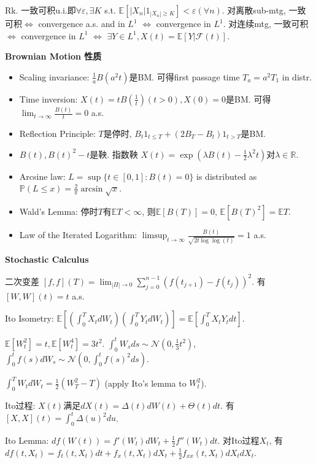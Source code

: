 \documentclass[UTF8]{ctexart}
\begin{document}
Rk. 一致可积u.i.即$\forall \varepsilon, \exists K$ s.t. $\mathbb{E}[|X_n|1_{|X_n|\geq K}]<\varepsilon (\forall n)$.
对离散sub-mtg, 一致可积$\Leftrightarrow$ convergence a.s. and in $L^1$  $\Leftrightarrow$ convergence in $L^1$.
对连续mtg, 一致可积$\Leftrightarrow$ convergence in $L^1$  $\Leftrightarrow$ $\exists Y\in L^1, X(t)=\mathbb{E}[Y|\mathcal{F}(t)]$.


\noindent \textbf{Brownian Motion 性质}
\begin{itemize}
\item Scaling invariance: $\frac{1}{a} B(a^2t)$是BM. 可得first passage time $T_a=a^2 T_1$ in distr.
\item Time inversion: $X(t)=tB(\frac{1}{t})(t>0),X(0)=0$是BM. 可得 $\lim_{t\to\infty}\frac{B(t)}{t}=0$ a.s. 
\item Reflection Principle: $T$是停时, $B_t1_{t\leq T}+(2B_T-B_t)1_{t>T}$是BM.
\item $B(t), B(t)^2-t$是鞅. 指数鞅 $X(t)=\exp(\lambda B(t)-\frac12 \lambda^2 t)$对$\lambda\in\mathbb{R}$.
\item Arcsine law: $L=\sup \{t\in[0,1]:B(t)=0\}$ is distributed as $\mathbb{P}(L\leq x)=\frac{2}{\pi}\arcsin\sqrt{x}$.
\item Wald's Lemma: 停时$T$有$\mathbb{E}T <\infty$, 则$\mathbb{E}[B(T)]=0$, $\mathbb{E}[B(T)^2]=\mathbb{E}T$.
\item Law of the Iterated Logarithm: $\limsup _{t \rightarrow \infty} \frac{B(t)}{\sqrt{2 t \log \log (t)}}=1$ a.s.
\end{itemize}


\noindent \textbf{Stochastic Calculus}

二次变差 $[f,f](T)=\lim_{|\Pi|\to 0} \sum_{j=0}^{n-1}(f(t_{j+1})-f(t_j))^2$. 有 $[W,W](t)=t$ a.s.

Ito Isometry: $\mathbb{E}\left[ (\int_0^T X_t dW_t)(\int_0^T Y_t dW_t) \right]
=\mathbb{E}\left[ \int_0^T X_t Y_t dt \right]$.

$\mathbb{E}[W_t^2]=t, \mathbb{E}[W_t^4]=3t^2$.
$\int_0^t W_s ds \sim \mathcal{N}(0,\frac13 t^2)$,
$\int_0^t f(s) dW_s \sim \mathcal{N}\left(0,\int_0^t f(s)^2 ds\right)$.

$\int_0^T W_tdW_t = \frac12 (W_T^2-T)$ (apply Ito's lemma to $W_t^2$).

Ito过程: $X(t)$满足$dX(t)=\Delta(t)dW(t)+\Theta(t)dt$.
有$[X,X](t)=\int_0^t \Delta(u)^2 du$.

Ito Lemma: $df(W(t)) = f'(W_t)dW_t + \frac{1}{2}f''(W_t)dt$. 
对Ito过程$X_t$, 有$df(t,X_t) = f_t(t,X_t)dt + f_x(t,X_t)dX_t+\frac{1}{2}f_{xx}(t,X_t)dX_tdX_t$.
\end{document}
